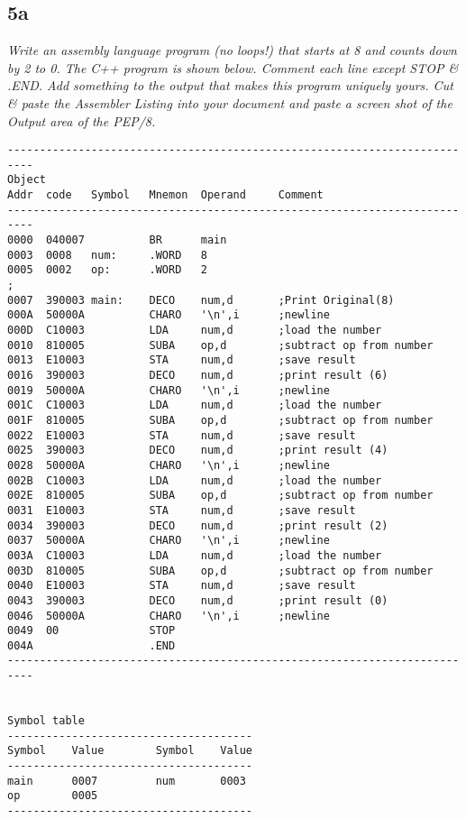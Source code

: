 \documentclass[a4paper,man,natbib]{apa6}
\begin{document}
{{\subsection{5a}
\emph{Write an assembly language program (no loops!)  that starts at 8 and counts down by 2 to 0. The C++ program is shown below. Comment each line except STOP \& .END. Add something to the output that makes this program uniquely yours. Cut \& paste the Assembler Listing into your document and paste a screen shot of the Output area of the PEP/8.} \\
{\renewcommand\fcolorbox[4][]{\textcolor{black}{\strut#4}}
	\begin{verbatim}
--------------------------------------------------------------------------
Object
Addr  code   Symbol   Mnemon  Operand     Comment
--------------------------------------------------------------------------
0000  040007          BR      main        
0003  0008   num:     .WORD   8           
0005  0002   op:      .WORD   2           
;
0007  390003 main:    DECO    num,d       ;Print Original(8)
000A  50000A          CHARO   '\n',i      ;newline
000D  C10003          LDA     num,d       ;load the number
0010  810005          SUBA    op,d        ;subtract op from number
0013  E10003          STA     num,d       ;save result
0016  390003          DECO    num,d       ;print result (6)
0019  50000A          CHARO   '\n',i      ;newline
001C  C10003          LDA     num,d       ;load the number
001F  810005          SUBA    op,d        ;subtract op from number
0022  E10003          STA     num,d       ;save result
0025  390003          DECO    num,d       ;print result (4)
0028  50000A          CHARO   '\n',i      ;newline
002B  C10003          LDA     num,d       ;load the number
002E  810005          SUBA    op,d        ;subtract op from number
0031  E10003          STA     num,d       ;save result
0034  390003          DECO    num,d       ;print result (2)
0037  50000A          CHARO   '\n',i      ;newline
003A  C10003          LDA     num,d       ;load the number
003D  810005          SUBA    op,d        ;subtract op from number
0040  E10003          STA     num,d       ;save result
0043  390003          DECO    num,d       ;print result (0)
0046  50000A          CHARO   '\n',i      ;newline
0049  00              STOP                
004A                  .END                  
--------------------------------------------------------------------------


Symbol table
--------------------------------------
Symbol    Value        Symbol    Value
--------------------------------------
main      0007         num       0003
op        0005         
--------------------------------------
	\end{verbatim}
}}}
\end{document}
